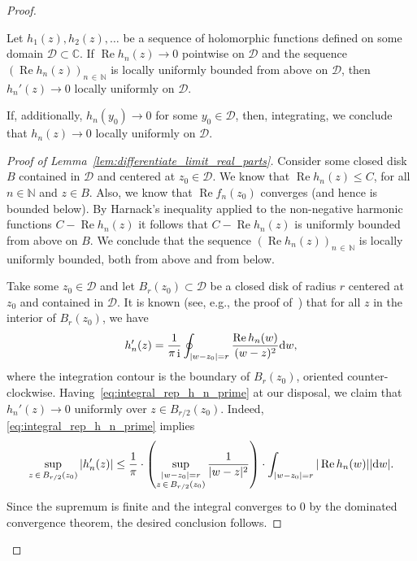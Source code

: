 \documentclass[AHL,Unicode,longabstracts,published]{cedram}
\DeclareMathOperator{\Ree}{Re}
\DeclareMathOperator{\ii}{i}
\newcommand{\N}{\mathbb{N}}
\newcommand{\C}{\mathbb{C}}
\newcommand{\cD}{\mathcal{D}}
\newcommand*\dint{\text{\normalfont d}}
\begin{document}
\begin{proof}
\begin{lemm}\label{lem:differentiate_limit_real_parts}
Let $h_1(z), h_2(z),\ldots$ be a sequence of holomorphic functions defined on some domain $\cD\subset \C$. If $\Ree h_n(z) \to 0$ pointwise on $\cD$ and the sequence $(\Ree h_n(z))_{n\,\in\,\N}$ is locally uniformly bounded from above on $\cD$, then $h_n'(z) \to 0$ locally uniformly on $\cD$.
\end{lemm}

\begin{rema}\label{rem:lem:differentiate_real_parts}
If, additionally, $h_n(y_0) \to 0$ for some $y_0\in \cD$, then, integrating, we conclude that $h_n(z) \to 0$ locally uniformly on $\cD$.
\end{rema}
\begin{proof}[{Proof of Lemma~\ref{lem:differentiate_limit_real_parts}}]
Consider some closed disk $B$ contained in $\cD$ and centered at $z_0\in \cD$. We know that $\Ree h_n (z)\leq C$, for all $n\in \N$ and $z\in B$. Also, we know that $\Ree f_n (z_0)$ converges (and hence is bounded below). By Harnack's inequality applied to the non-negative harmonic functions $C - \Ree h_n(z)$ it follows that $C-\Ree h_n(z)$ is uniformly bounded from above on $B$. We conclude that the sequence $(\Ree h_n(z))_{n\,\in\,\N}$ is locally uniformly bounded, both from above and from below.

Take some $z_0\in \cD$ and let $B_r(z_0)\subset \cD$ be a closed disk of radius $r$ centered at $z_0$ and contained in $\cD$. It is known (see, e.g., the proof of~\cite[Lemma~3.8]{kabluchko_rep_diff_free_poi}) that for all $z$ in the interior of $B_r(z_0)$, we have
\begin{equation}\label{eq:integral_rep_h_n_prime}
h_n'(z) = \frac 1 {\pi \ii} \oint_{|w-z_0| = r} \frac{\Ree h_n(w)}{(w-z)^2} \dint w,
\end{equation}
where the integration contour is the boundary of $B_r(z_0)$, oriented counter-clockwise. Having~\eqref{eq:integral_rep_h_n_prime} at our disposal, we claim that $h_n'(z) \to 0$ uniformly over $z\in B_{r/2}(z_0)$. Indeed, \eqref{eq:integral_rep_h_n_prime} implies
\[
\sup_{z\,\in\,B_{r/2}(z_0)} |h_n'(z)| \leq \frac 1 {\pi} \cdot \left(\sup_{\substack{|w-z_0| = r\\ z\,\in\, B_{r/2}(z_0)}} \frac{1}{|w-z|^2} \right) \cdot \int_{|w-z_0| = r} |\Ree h_n(w)| |\dint w|.
\]
Since the supremum is finite and the integral converges to $0$ by the dominated convergence theorem, the desired conclusion follows.
\end{proof}


\end{proof}
\end{document}
